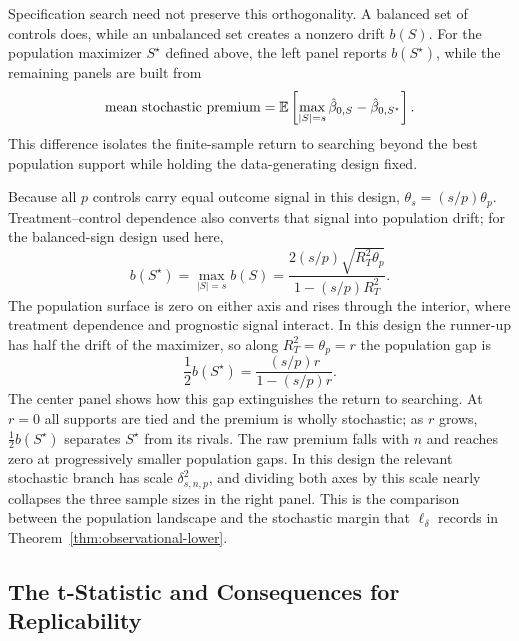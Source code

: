 Specification search need not preserve this orthogonality. A balanced set of
controls does, while an unbalanced set creates a nonzero drift $b(S)$. For the
population maximizer $S^\star$ defined above, the left panel reports
$b(S^\star)$, while the remaining panels are built from
\begin{equation*}
        \text{mean stochastic premium}
        =
        \mathbb{E}\left[
        \max_{|S|=s}\hat\beta_{0,S}-\hat\beta_{0,S^\star}
        \right].
\end{equation*}
This difference isolates the finite-sample return to searching beyond the
best population support while holding the data-generating design fixed.

Because all $p$ controls carry equal outcome signal in this design,
$\theta_s=(s/p)\theta_p$. Treatment--control dependence also converts that signal
into population drift; for the balanced-sign design used here,
\begin{equation*}
        b(S^\star)
        =
        \max_{|S|=s}b(S)
        =
        \frac{2(s/p)\sqrt{R_T^2\theta_p}}
        {1-(s/p)R_T^2}.
\end{equation*}
The population surface is zero on either axis and rises through the interior,
where treatment dependence and prognostic signal interact. In this design the
runner-up has half the drift of the maximizer, so along
$R_T^2=\theta_p=r$ the population gap is
\begin{equation*}
        \frac{1}{2}b(S^\star)
        =
        \frac{(s/p)r}{1-(s/p)r}.
\end{equation*}
The center panel shows how this gap extinguishes the return to searching. At
$r=0$ all supports are tied and the premium is wholly stochastic; as $r$ grows,
$\tfrac{1}{2}b(S^\star)$ separates $S^\star$ from its rivals. The raw premium
falls with $n$ and reaches zero at progressively smaller population gaps. In
this design the relevant stochastic branch has scale
$\delta_{s,n,p}^2$, and dividing both axes by this scale nearly collapses the
three sample sizes in the right panel. This is the comparison between the
population landscape and the stochastic margin that $\ell_\delta$ records in
Theorem~\ref{thm:observational-lower}.

\subsection{The t-Statistic and Consequences for Replicability}
\label{sec:tstat}

